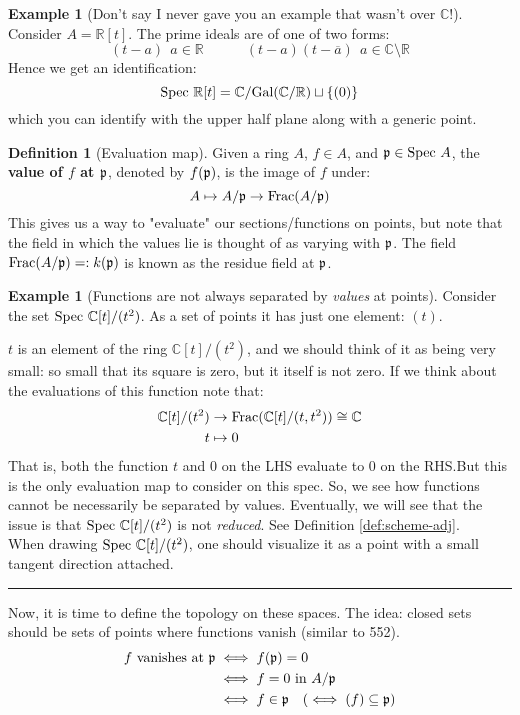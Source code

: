 \documentclass[10pt,reqno]{amsart}
\theoremstyle{definition}
\newtheorem{example}[theorem]{Example}
\newtheorem{definition}[theorem]{Definition}
\theoremstyle{remark}
\numberwithin{equation}{section}
\numberwithin{theorem}{section}
\newcommand{\C}{{\mathbb C}}
\newcommand{\spec}{\textup{Spec }}
\newcommand{\R}{{\mathbb R}}
\newcommand{\pp}{\frak{p}}
\begin{document}
\begin{example}[Don't say I never gave you an example that wasn't over $\C$!] Consider $A = \R[t]$. The prime ideals are of one of two forms:
\[(t-a) \ \ a \in \R \quad \quad \quad (t-a)(t-\overline{a}) \ \ a \in \C \setminus \R\]
Hence we get an identification:
\[\spec \R[t] = \C/\textup{Gal}(\C/\R) \sqcup \{(0)\}\]
which you can identify with the upper half plane along with a generic point.
\end{example}

\begin{definition}[Evaluation map] Given a ring $A$, $f \in A$, and $\pp \in \spec A$, the \textbf{value of $f$ at $\pp$}, denoted by $f(\pp)$, is the image of $f$ under:
\[A \mapsto A/\pp \to \textup{Frac}(A/\pp)\]
This gives us a way to "evaluate" our sections/functions on points, but note that the field in which the values lie is thought of as varying with $\pp$. The field $\textup{Frac}(A/\pp) =: k(\pp)$ is known as the residue field at $\pp$.
\end{definition}

\begin{example}[Functions are not always separated by \textit{values} at points]\label{example:dualnumbers} Consider the set $\spec \C[t]/(t^2)$. As a set of points it has just one element: $(t)$.

$t$ is an element of the ring $\C[t]/(t^2)$, and we should think of it as being very small: so small that its square is zero, but it itself is not zero. If we think about the evaluations of this function note that:
\begin{align*}
\C[t]/(t^2) &\to \textup{Frac}(\C[t]/(t,t^2)) \cong \C\\
t & \mapsto 0
\end{align*}
That is, both the function $t$ and $0$ on the LHS evaluate to 0 on the RHS.But this is the only evaluation map to consider on this spec. So, we see how functions cannot be necessarily be separated by values. Eventually, we will see that the issue is that $\spec \C[t]/(t^2)$ is not \textit{reduced}. See Definition \ref{def:scheme-adj}.
\\

When drawing $\spec \C[t]/(t^2)$, one should visualize it as a point with a small tangent direction attached.
\end{example}

\hrule
\vspace{1em}

Now, it is time to define the topology on these spaces. The idea: closed sets should be sets of points where functions vanish (similar to 552).
\begin{align*}
f \textup{ vanishes at } \pp &\iff f(\pp) = 0 \\
& \iff f = 0 \textup{ in } A/\pp\\
&\iff f \in \pp \quad (\iff (f) \subseteq \pp)
\end{align*}
\end{document}
